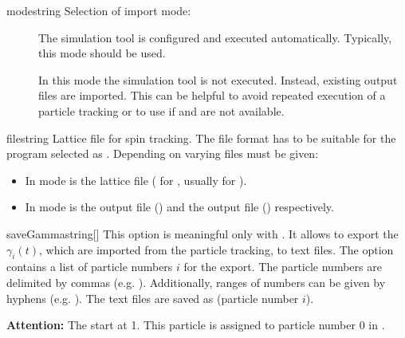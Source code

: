 \documentclass[a4paper]{scrartcl}
\begin{document}
\begin{configdoc}{mode}{string}{}
  Selection of import mode:
  \begin{description}
  \item[] The simulation tool is configured and executed automatically.
    Typically, this mode should be used.
  \item[] In this mode the simulation tool is not executed. Instead,
    existing output files are imported. This can be helpful to avoid repeated execution of
    a particle tracking or to use \polem if \ele and \madx are not available.
  \end{description}
\end{configdoc}

\begin{configdoc}{file}{string}{}
  Lattice file for spin tracking. The file format has to be suitable for the program
  selected as .
  Depending on  varying files must be given:
  \begin{itemize}
  \item In  mode  is the lattice file
    ( for \ele, usually  for \madx).
  \item In  mode  is the  output
    file (\ele) and the  output file (\madx) respectively.
  \end{itemize}
\end{configdoc}


\begin{configdoc}{saveGamma}{string}{}[]
  This option is meaningful only with  . It
  allows to export the $\gamma_i(t)$, which are imported from the particle tracking, to
  text files. The option contains a list of particle numbers $i$ for the export.
  The particle numbers are delimited by commas (e.g. ). Additionally,
  ranges of numbers can be given by hyphens (e.g. ). The text files are
  saved as  (particle number $i$).

  \textbf{Attention:} The \ele {} start at 1. This particle is
  assigned to particle number 0 in \polem.
\end{configdoc}
\end{document}
